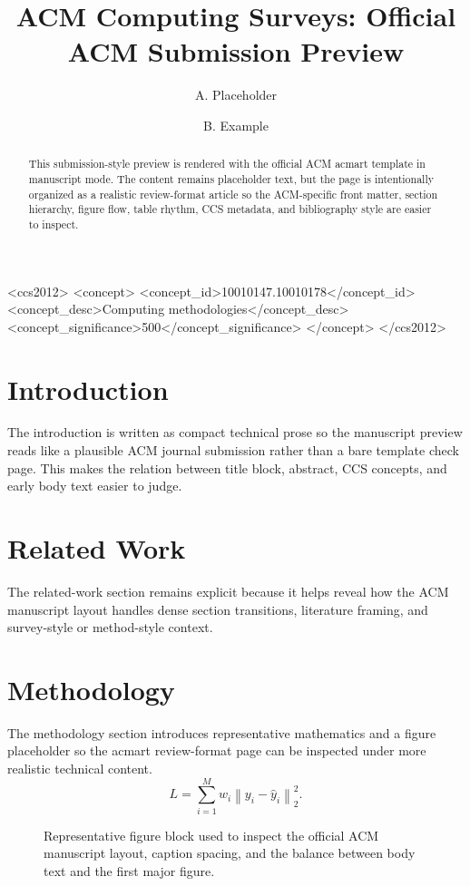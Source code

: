 \documentclass[manuscript]{acmart}
\title{ACM Computing Surveys: Official ACM Submission Preview}
\author{A. Placeholder}
\affiliation{%
  \institution{Department of Verified Templates, Placeholder Institute}
  \city{Placeholder City}
  \country{Country}
}
\author{B. Example}
\affiliation{%
  \institution{Journal Systems Lab, Example University}
  \city{Example City}
  \country{Country}
}
\begin{document}
\begin{abstract}
This submission-style preview is rendered with the official ACM acmart template in manuscript mode. The content remains placeholder text, but the page is intentionally organized as a realistic review-format article so the ACM-specific front matter, section hierarchy, figure flow, table rhythm, CCS metadata, and bibliography style are easier to inspect.
\end{abstract}
\begin{CCSXML}
<ccs2012>
<concept>
<concept_id>10010147.10010178</concept_id>
<concept_desc>Computing methodologies</concept_desc>
<concept_significance>500</concept_significance>
</concept>
</ccs2012>
\end{CCSXML}
\maketitle
\section{Introduction}
The introduction is written as compact technical prose so the manuscript preview reads like a plausible ACM journal submission rather than a bare template check page. This makes the relation between title block, abstract, CCS concepts, and early body text easier to judge.
\section{Related Work}
The related-work section remains explicit because it helps reveal how the ACM manuscript layout handles dense section transitions, literature framing, and survey-style or method-style context.
\section{Methodology}
The methodology section introduces representative mathematics and a figure placeholder so the acmart review-format page can be inspected under more realistic technical content.
\begin{equation}
L = \sum_{i=1}^{M} w_i \left\| y_i - \hat{y}_i \right\|_2^2.
\end{equation}
\begin{figure}[t]
\centering
{}
\caption{Representative figure block used to inspect the official ACM manuscript layout, caption spacing, and the balance between body text and the first major figure.}
\end{figure}
\end{document}
